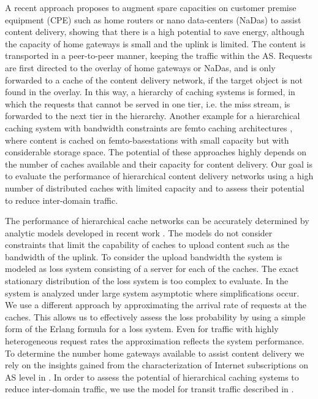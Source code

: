 A recent approach \cite{valancius2009greening} proposes to augment spare capacities on customer premise equipment (CPE) such as home routers or nano data-centers (NaDas) to assist content delivery, showing that there is a high potential to save energy, although the capacity of home gateways is small and the uplink is limited.
The content is transported in a peer-to-peer manner, keeping the traffic within the AS.
Requests are first directed to the overlay of home gateways or NaDas, and is only forwarded to a cache of the content delivery network, if the target object is not found in the overlay.
In this way, a hierarchy of caching systems is formed, in which the requests that cannot be served in one tier, i.e. the miss stream, is forwarded to the next tier in the hierarchy.
Another example for a hierarchical caching system with bandwidth constraints are femto caching architectures \cite{golrezaei2013femtocaching}, where content is cached on femto-basestations with small capacity but with considerable storage space.
The potential of these approaches highly depends on the number of caches available and their capacity for content delivery.
Our goal is to evaluate the performance of hierarchical content delivery networks using a high number of distributed caches with limited capacity and to assess their potential to reduce inter-domain traffic.



The performance of hierarchical cache networks can be accurately determined by analytic models developed in recent work \cite{che2002hierarchical, martina2014unified}.
The models do not consider constraints that limit the capability of caches to upload content such as the bandwidth of the uplink.
To consider the upload bandwidth the system is modeled as loss system consisting of a server for each of the caches. The exact stationary distribution of the loss system is too complex to evaluate.
In \cite{tan2013optimal} the system is analyzed under large system asymptotic where simplifications occur.
We use a different approach by approximating the arrival rate of requests at the caches.
This allows us to effectively assess the loss probability by using a simple form of the Erlang formula for a loss system.
Even for traffic with highly heterogeneous request rates the approximation reflects the system performance.
To determine the number home gateways available to assist content delivery we rely on the insights gained from the characterization of Internet subscriptions on AS level in .
In order to assess the potential of hierarchical caching systems to reduce inter-domain traffic, we use the model for transit traffic described in .

